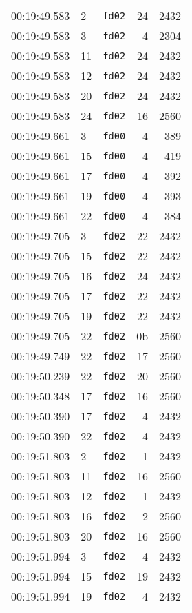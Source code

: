 \documentclass{article}
\begin{document}
\begin{longtable}{lllrr}
00:19:49.583 & 2 & \texttt{fd02} & 24 & 2432 \\
00:19:49.583 & 3 & \texttt{fd02} & 4 & 2304 \\
00:19:49.583 & 11 & \texttt{fd02} & 24 & 2432 \\
00:19:49.583 & 12 & \texttt{fd02} & 24 & 2432 \\
00:19:49.583 & 20 & \texttt{fd02} & 24 & 2432 \\
00:19:49.583 & 24 & \texttt{fd02} & 16 & 2560 \\
00:19:49.661 & 3 & \texttt{fd00} & 4 & 389 \\
00:19:49.661 & 15 & \texttt{fd00} & 4 & 419 \\
00:19:49.661 & 17 & \texttt{fd00} & 4 & 392 \\
00:19:49.661 & 19 & \texttt{fd00} & 4 & 393 \\
00:19:49.661 & 22 & \texttt{fd00} & 4 & 384 \\
00:19:49.705 & 3 & \texttt{fd02} & 22 & 2432 \\
00:19:49.705 & 15 & \texttt{fd02} & 22 & 2432 \\
00:19:49.705 & 16 & \texttt{fd02} & 24 & 2432 \\
00:19:49.705 & 17 & \texttt{fd02} & 22 & 2432 \\
00:19:49.705 & 19 & \texttt{fd02} & 22 & 2432 \\
00:19:49.705 & 22 & \texttt{fd02} & 0b & 2560 \\
00:19:49.749 & 22 & \texttt{fd02} & 17 & 2560 \\
00:19:50.239 & 22 & \texttt{fd02} & 20 & 2560 \\
00:19:50.348 & 17 & \texttt{fd02} & 16 & 2560 \\
00:19:50.390 & 17 & \texttt{fd02} & 4 & 2432 \\
00:19:50.390 & 22 & \texttt{fd02} & 4 & 2432 \\
00:19:51.803 & 2 & \texttt{fd02} & 1 & 2432 \\
00:19:51.803 & 11 & \texttt{fd02} & 16 & 2560 \\
00:19:51.803 & 12 & \texttt{fd02} & 1 & 2432 \\
00:19:51.803 & 16 & \texttt{fd02} & 2 & 2560 \\
00:19:51.803 & 20 & \texttt{fd02} & 16 & 2560 \\
00:19:51.994 & 3 & \texttt{fd02} & 4 & 2432 \\
00:19:51.994 & 15 & \texttt{fd02} & 19 & 2432 \\
00:19:51.994 & 19 & \texttt{fd02} & 4 & 2432 \\

\end{longtable}
\end{document}

